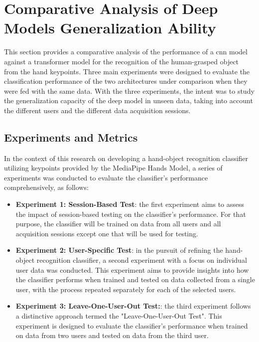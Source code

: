 \section{Comparative Analysis of Deep Models Generalization Ability}
\label{section:comparative_analysis}

This section provides a comparative analysis of the performance of a \acs{cnn} model against a transformer model for the recognition of the human-grasped object from the hand keypoints. Three main experiments were designed to evaluate the classification performance of the two architectures under comparison when they were fed with the same data. With the three experiments, the intent was to study the generalization capacity of the deep model in unseen data, taking into account the different users and the different data acquisition sessions.

\subsection{Experiments and Metrics}
In the context of this research on developing a hand-object recognition classifier utilizing keypoints provided by the MediaPipe Hands Model, a series of experiments was conducted to evaluate the classifier's performance comprehensively, as follows:
\begin{itemize}
  
  \item \textbf{Experiment 1: Session-Based Test}: the first experiment aims to assess the impact of session-based testing on the classifier's performance. For that purpose, the classifier will be trained on data from all users and all acquisition sessions except one that will be used for testing.
  
  \item \textbf{Experiment 2: User-Specific Test}: in the pursuit of refining the hand-object recognition classifier, a second experiment with a focus on individual user data was conducted. This experiment aims to provide insights into how the classifier performs when trained and tested on data collected from a single user, with the process repeated separately for each of the selected users.
  
  \item \textbf{Experiment 3: Leave-One-User-Out Test:}: the third experiment follows a distinctive approach termed the "Leave-One-User-Out Test". This experiment is designed to evaluate the classifier's performance when trained on data from two users and tested on data from the third user.
  
\end{itemize}

